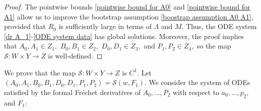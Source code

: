 \documentclass[11pt]{article}
\numberwithin{equation}{section}
\begin{document}
\begin{proof}
        The pointwise bounds \eqref{pointwise bound for A0} and \eqref{pointwise bound for A1} allow us to improve the bootstrap assumption \eqref{boostrap assumption A0 A1}, provided that $R_0$ is sufficiently large in terms of $\Lambda$ and $M$. Thus, the ODE system \eqref{dr A_1}-\eqref{ODE system data} has global solutions. Moreover, the proof implies that $A_0,A_1\in Z_1,$ $B_0,B_1\in Z_2,$ $D_0,D_1\in Z_3,$ and $P_1,P_2\in Z_4,$ so the map $\mathcal{S}:W\times Y\rightarrow Z$ is well-defined.
    \end{proof}

We prove that the map $\mathcal{S}:W\times Y\rightarrow Z$ is $C^1.$ Let $(A_0,A_1,B_0,B_1,D_0,D_1,P_1,P_2)=\mathcal{S}(w,F_1).$ We consider the system of ODEs satisfied by the formal Fréchet derivatives of $A_0,\ldots,P_2$ with respect to $a_0,\ldots,p_2,$ and $F_1$:
\end{document}
